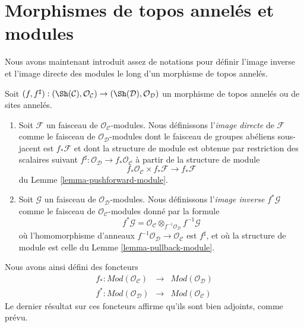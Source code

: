 \section{Morphismes de topos annelés et modules}
\label{section-functoriality-modules}

\noindent
Nous avons maintenant introduit assez de notations pour définir l'image inverse
et l'image directe des modules le long d'un morphisme de topos annelés.

\begin{definition}
\label{definition-pushforward}
Soit
$(f, f^\sharp) :
(\Sh(\mathcal{C}), \mathcal{O}_\mathcal{C})
\to
(\Sh(\mathcal{D}), \mathcal{O}_\mathcal{D})$
un morphisme de topos annelés ou de sites annelés.
\begin{enumerate}
\item Soit $\mathcal{F}$ un faisceau de $\mathcal{O}_\mathcal{C}$-modules. Nous
définissons l'{\it image directe} de $\mathcal{F}$ comme le faisceau de
$\mathcal{O}_\mathcal{D}$-modules dont le faisceau de groupes abéliens
sous-jacent est $f_*\mathcal{F}$ et dont la structure de module est obtenue par
restriction des scalaires suivant
$f^\sharp : \mathcal{O}_\mathcal{D} \to f_*\mathcal{O}_\mathcal{C}$ à partir
de la structure de module
$$
f_*\mathcal{O}_\mathcal{C} \times f_*\mathcal{F}
\longrightarrow
f_*\mathcal{F}
$$
du Lemme \ref{lemma-pushforward-module}.
\item Soit $\mathcal{G}$ un faisceau de $\mathcal{O}_\mathcal{D}$-modules. Nous
définissons l'{\it image inverse} $f^*\mathcal{G}$ comme le faisceau de
$\mathcal{O}_\mathcal{C}$-modules donné par la formule
$$
f^*\mathcal{G}
=
\mathcal{O}_\mathcal{C} \otimes_{f^{-1}\mathcal{O}_\mathcal{D}}
f^{-1}\mathcal{G}
$$
où l'homomorphisme d'anneaux
$f^{-1}\mathcal{O}_\mathcal{D} \to \mathcal{O}_\mathcal{C}$
est $f^\sharp$, et où la structure de module est celle du Lemme
\ref{lemma-pullback-module}.
\end{enumerate}
\end{definition}

\noindent
Nous avons ainsi défini des foncteurs
\begin{eqnarray*}
f_* : \textit{Mod}(\mathcal{O}_\mathcal{C})
& \longrightarrow &
\textit{Mod}(\mathcal{O}_\mathcal{D}) \\
f^* : \textit{Mod}(\mathcal{O}_\mathcal{D})
& \longrightarrow &
\textit{Mod}(\mathcal{O}_\mathcal{C})
\end{eqnarray*}
Le dernier résultat sur ces foncteurs affirme qu'ils sont bien adjoints, comme
prévu.

